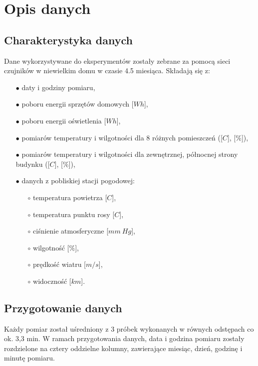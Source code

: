 \documentclass[a4paper,11pt,twoside]{mwrep}  %
\begin{document}
\endgroup

\begingroup
\let\clearpage\relax
\chapter{Opis danych}

\section{Charakterystyka danych}

Dane wykorzystywane do eksperymentów zostały zebrane za pomocą sieci czujników w niewielkim domu w czasie 4.5 miesiąca. 
Składają się z:
\begin{itemize}
\item[$\bullet$] daty i godziny pomiaru,
\item[$\bullet$] poboru energii sprzętów domowych [$Wh$],
\item[$\bullet$] poboru energii oświetlenia [$Wh$],
\item[$\bullet$] pomiarów temperatury i wilgotności dla 8 różnych pomieszczeń ([\degree $C$], [$\%$]),
\item[$\bullet$] pomiarów temperatury i wilgotności dla zewnętrznej, północnej strony budynku ([\degree $C$], [$\%$]),
\item[$\bullet$] danych z pobliskiej stacji pogodowej:
	\begin{itemize}
	\item[$\circ$] temperatura powietrza [\degree $C$],
	\item[$\circ$] temperatura punktu rosy [\degree $C$],
	\item[$\circ$] ciśnienie atmosferyczne [$mm~Hg$],
	\item[$\circ$] wilgotność [$\%$],
	\item[$\circ$] prędkość wiatru [$m/s$],
	\item[$\circ$] widoczność [$km$].
	\end{itemize}
\end{itemize}

\section{Przygotowanie danych}
Każdy pomiar został uśredniony z 3 próbek wykonanych w równych odstępach co ok. 3,3 min. W ramach przygotowania danych, data i godzina pomiaru zostały rozdzielone na cztery oddzielne kolumny, zawierające miesiąc, dzień, godzinę i minutę pomiaru.
\endgroup
\end{document}
